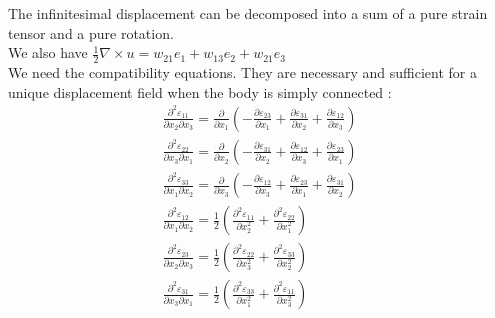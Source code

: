 \documentclass[../main.tex]{subfiles}
\begin{document}
The infinitesimal displacement can be decomposed into a sum of a pure strain tensor and a pure rotation.\\

We also have $\frac{1}{2}\nabla \times u = w_{21}e_1 + w_{13} e_2 + w_{21}e_3$\\

We need the compatibility equations. They are necessary and sufficient for a unique displacement field when the body is simply connected : \begin{equation}
    \begin{gathered}
        \frac{\partial^2 \varepsilon_{11}}{\partial x_2 \partial x_3} = \frac{\partial}{\partial x_1}(-\frac{\partial \varepsilon_{23}}{\partial x_1} + \frac{\partial \varepsilon_{31}}{\partial x_2} + \frac{\partial \varepsilon_{12}}{\partial x_3})\\
        \frac{\partial^2 \varepsilon_{22}}{\partial x_3 \partial x_1} = \frac{\partial}{\partial x_2}(-\frac{\partial \varepsilon_{31}}{\partial x_2} + \frac{\partial \varepsilon_{12}}{\partial x_3} + \frac{\partial \varepsilon_{23}}{\partial x_1})\\
        \frac{\partial^2 \varepsilon_{33}}{\partial x_1 \partial x_2} = \frac{\partial}{\partial x_3}(-\frac{\partial \varepsilon_{12}}{\partial x_3} + \frac{\partial \varepsilon_{23}}{\partial x_1} + \frac{\partial \varepsilon_{31}}{\partial x_2})\\
        \frac{\partial^2 \varepsilon_{12}}{\partial x_1 \partial x_2} = \frac{1}{2}(\frac{\partial^2 \varepsilon_{11}}{\partial x_2^2} + \frac{\partial^2 \varepsilon_{22}}{\partial x_1^2})\\
        \frac{\partial^2 \varepsilon_{23}}{\partial x_2 \partial x_3} = \frac{1}{2}(\frac{\partial^2 \varepsilon_{22}}{\partial x_3^2} + \frac{\partial^2 \varepsilon_{33}}{\partial x_2^2})\\
        \frac{\partial^2 \varepsilon_{31}}{\partial x_3 \partial x_1} = \frac{1}{2}(\frac{\partial^2 \varepsilon_{33}}{\partial x_1^2} + \frac{\partial^2 \varepsilon_{11}}{\partial x_3^2})\\
    \end{gathered}
\end{equation}
\end{document}
